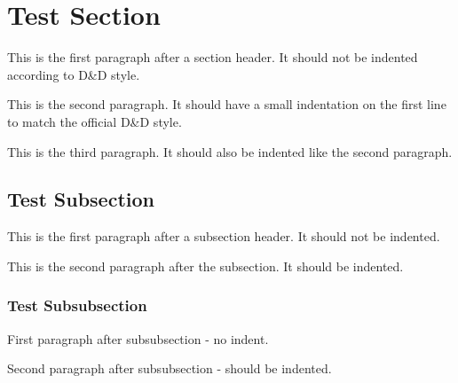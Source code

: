 \documentclass[bg=full,justified]{dndbook}
\begin{document}
\section{Test Section}

This is the first paragraph after a section header. It should not be indented according to D\&D style.

This is the second paragraph. It should have a small indentation on the first line to match the official D\&D style.

This is the third paragraph. It should also be indented like the second paragraph.

\subsection{Test Subsection}

This is the first paragraph after a subsection header. It should not be indented.

This is the second paragraph after the subsection. It should be indented.

\subsubsection{Test Subsubsection}

First paragraph after subsubsection - no indent.

Second paragraph after subsubsection - should be indented.
\end{document}
